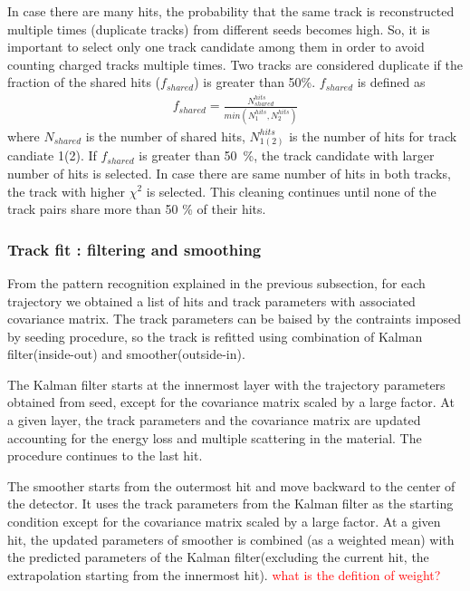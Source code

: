 
In case there are many hits, the probability that the same track is reconstructed 
multiple times (duplicate tracks) from different seeds becomes high. 
So, it is important to select only one track candidate among them 
in order to avoid counting charged tracks multiple times. 
Two tracks are considered duplicate if the fraction of the shared hits 
($f_{shared}$) is greater than 50\%.  $f_{shared}$ is defined as 
\begin{eqnarray} 
f_{shared} = \frac{N_{shared}^{hits}}{min (N_1^{hits}, N_2^{hits}) }  
\end{eqnarray}  
where $N_{shared}$ is the number of shared hits, $N_{1(2)}^{hits}$ 
is the number of hits for track candiate 1(2). If $f_{shared}$ is 
greater than 50~\%, the track candidate with larger number of hits is selected. 
In case there are same number of hits in both tracks, the track with higher $\chi^2$
is selected. This cleaning continues until none of the track pairs share more than 
50 \% of their hits.  


\subsubsection{Track fit : filtering and smoothing}

From the pattern recognition explained in the previous subsection, 
for each trajectory we obtained a list of hits and track parameters 
with associated covariance matrix. The track parameters can be baised 
by the contraints imposed by seeding procedure, so the track is refitted 
using combination of Kalman filter(inside-out) and smoother(outside-in). 

The Kalman filter starts at the innermost layer with the trajectory 
parameters obtained from seed, except for the covariance matrix scaled 
by a large factor.  
At a given layer, the track parameters and the covariance matrix are updated
accounting for the energy loss and multiple scattering in the material.
The procedure continues to the last hit.

The smoother starts from the outermost hit and move backward to the center of the detector. 
It uses the track parameters from the Kalman filter as the starting condition 
except for the covariance matrix scaled by a large factor. 
At a given hit, the updated parameters of smoother is combined (as a weighted mean) 
with the predicted parameters of the Kalman filter(excluding the current hit, 
the extrapolation starting from the innermost hit).
\textcolor{red}{what is the defition of weight?} 

